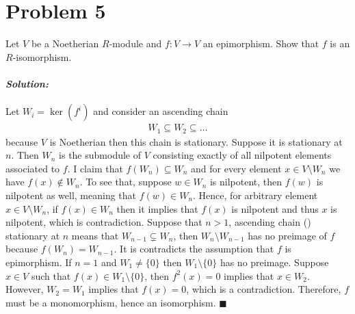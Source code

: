 \documentclass[12pt, a4paper]{article}
\theoremstyle{remark}
\newenvironment{solution}
  {\paragraph{\textit{Solution:}}\par\medskip}
  {\hfill$\blacksquare$\vspace{0.1cm}}
\begin{document}
\section*{Problem 5}
Let $V$ be a Noetherian $R$-module and $f : V \to V$ an epimorphism. Show that $f$ is an $R$-isomorphism.

\begin{solution}
    Let $W_i=\ker(f^i)$ and consider an ascending chain
    \begin{align*}
        W_1\subseteq W_2\subseteq\dots \tag{\Gemini}
    \end{align*}
    because $V$ is Noetherian then this chain is stationary. Suppose it is stationary at $n$. 
    Then $W_n$ is the submodule of $V$ consisting exactly of all nilpotent elements associated to $f$.
    I claim that $f(W_n)\subseteq W_n$ and for every element $x\in V\setminus W_n$ we have $f(x)\notin W_n$.
    To see that, suppose $w\in W_n$ is nilpotent, then $f(w)$ is nilpotent as well, meaning that $f(w)\in W_n$.
    Hence, for arbitrary element $x\in V\setminus W_n$, if $f(x)\in W_n$ then it implies that  $f(x)$ is nilpotent and thus $x$ is nilpotent, which is contradiction.
    Suppose that $n>1$, ascending chain (\Gemini) stationary at $n$ means that $W_{n-1}\subsetneq W_{n}$, then $W_n\setminus W_{n-1}$ has no preimage of $f$ because $f(W_n)=W_{n-1}$.
    It is contradicts the assumption that $f$ is epimorphism.
    If $n=1$ and $W_1\neq \{0\}$ then $W_1 \setminus \{0\}$ has no preimage. Suppose $x\in V$ such that $f(x)\in W_1 \setminus \{0\}$, then $f^2(x) = 0$ implies that $x\in W_2$. 
    However, $W_2=W_1$ implies that $f(x)=0$, which is a contradiction. 
    Therefore, $f$ must be a monomorphism, hence an isomorphism. 
\end{solution}
\end{document}
